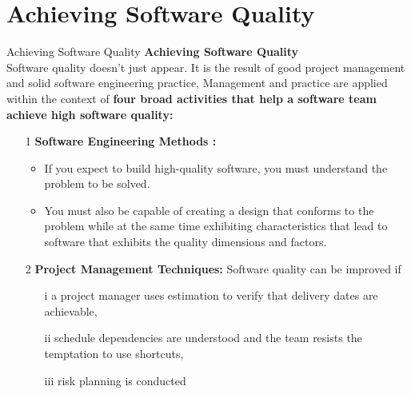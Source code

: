 \documentclass{beamer}
\begin{document}
\section{Achieving Software Quality}
\begin{frame}{Achieving Software Quality}
	\textbf{Achieving Software Quality}\\
	Software quality doesn’t just appear. It is the result of good project management and solid software engineering practice, Management and practice are applied within the context of \textbf{four broad activities that 
		help a software team achieve high software quality:}
	
	\begin{itemize}
		\item[1] \textbf{Software Engineering Methods :}
		\begin{itemize}
			\item If you expect to build high-quality software, you must understand the problem to be solved.
			\item You must also be capable of creating a design that conforms to the problem while at the same time exhibiting characteristics that lead to software that exhibits the quality dimensions and factors.
		\end{itemize} 
		\item[2]\textbf{ Project Management Techniques:} Software quality can be improved if 
		\begin{itemize}
			\item[i] a project manager uses estimation to verify that delivery dates are achievable, 
			\item[ii] schedule dependencies are understood and the team resists the temptation to use shortcuts, 
			\item[iii] risk planning is conducted 
		\end{itemize}
	\end{itemize}
\end{frame}
\end{document}
